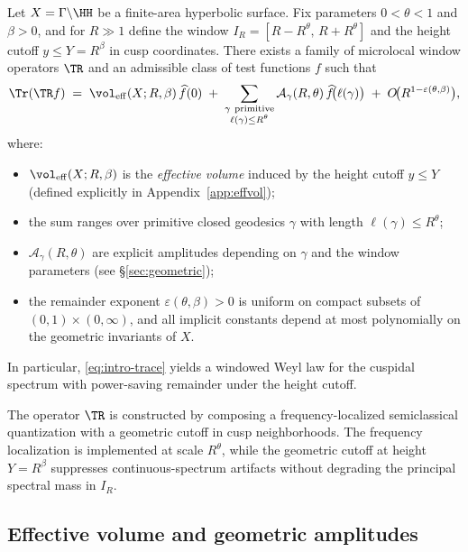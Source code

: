 \begin{theorem}\label{thm:intro}
Let $X=\Gamma\backslash\HH$ be a finite-area hyperbolic surface. Fix parameters $0<\theta<1$ and $\beta>0$, and for $R\gg1$ define the window $I_R=[R-R^\theta,\,R+R^\theta]$ and the height cutoff $y\le Y=R^\beta$ in cusp coordinates. There exists a family of microlocal window operators $\TR$ and an admissible class of test functions $f$ such that
\begin{equation}\label{eq:intro-trace}
  \Tr(\TR f)
  \;=\;
  \vol_{\mathrm{eff}}(X;R,\beta)\,\widehat{f}(0)
  \;+\;
  \sum_{\substack{\gamma\ \text{primitive}\\ \ell(\gamma)\le R^\theta}}
  \mathcal{A}_\gamma(R,\theta)\,\widehat{f}\!\big(\ell(\gamma)\big)
  \;+\;
  O\!\big(R^{1-\varepsilon(\theta,\beta)}\big),
\end{equation}
where:
\begin{itemize}
  \item $\vol_{\mathrm{eff}}(X;R,\beta)$ is the \emph{effective volume} induced by the height cutoff $y\le Y$ (defined explicitly in Appendix~\ref{app:effvol});
  \item the sum ranges over primitive closed geodesics $\gamma$ with length $\ell(\gamma)\le R^\theta$;
  \item $\mathcal{A}_\gamma(R,\theta)$ are explicit amplitudes depending on $\gamma$ and the window parameters (see \S\ref{sec:geometric});
  \item the remainder exponent $\varepsilon(\theta,\beta)>0$ is uniform on compact subsets of $(0,1)\times(0,\infty)$, and all implicit constants depend at most polynomially on the geometric invariants of $X$.
\end{itemize}
In particular, \eqref{eq:intro-trace} yields a windowed Weyl law for the cuspidal spectrum with power-saving remainder under the height cutoff.
\end{theorem}

The operator $\TR$ is constructed by composing a frequency-localized semiclassical quantization with a geometric cutoff in cusp neighborhoods. The frequency localization is implemented at scale $R^\theta$, while the geometric cutoff at height $Y=R^\beta$ suppresses continuous-spectrum artifacts without degrading the principal spectral mass in $I_R$.

\subsection{Effective volume and geometric amplitudes}

